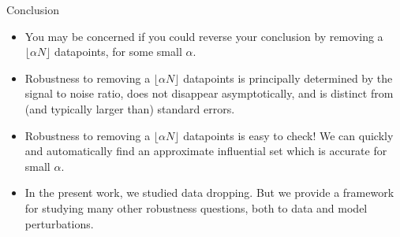 

\begin{frame}{Conclusion}

\begin{itemize}
\item You may be concerned if you could reverse your conclusion by removing
a $\lfloor \alpha N \rfloor$ datapoints, for some small $\alpha$.

\pause
\item Robustness to removing a $\lfloor \alpha N \rfloor$ datapoints is
principally determined by the signal to noise ratio, does not disappear
asymptotically, and is distinct from (and typically larger than) standard
errors.

\pause
\item Robustness to removing a $\lfloor \alpha N \rfloor$ datapoints is
easy to check!  We can quickly and automatically find an
approximate influential set which is accurate for small $\alpha$.

\pause
\item In the present work, we studied data dropping.  But we
provide a framework for studying many other robustness
questions, both to data and model perturbations.


\end{itemize}

\end{frame}


